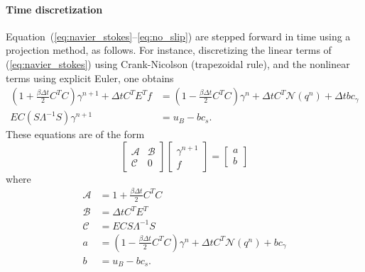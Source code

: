 \documentclass[11pt]{article}
\begin{document}
\paragraph{Time discretization}
Equation~(\ref{eq:navier_stokes}--\ref{eq:no_slip}) are stepped forward in time using a projection method, as follows.  For instance, discretizing the linear terms of (\ref{eq:navier_stokes}) using Crank-Nicolson (trapezoidal rule), and the nonlinear terms using explicit Euler, one obtains
\begin{align}
	\left(1+\frac{\beta\Delta t}{2}C^TC\right)\gamma^{n+1} + \Delta t C^TE^Tf &= \left(1 - \frac{\beta\Delta t}{2}C^TC\right)\gamma^n + \Delta t C^T \mathcal{N}(q^n) + \Delta t bc_\gamma \label{eq:timestepper}\\
	EC(S\Lambda^{-1}S)\gamma^{n+1} &= u_B - bc_s.
\end{align}
These equations are of the form
\begin{equation}
	\begin{bmatrix}
		\mathcal{A} & \mathcal{B}\\\mathcal{C} & 0
	\end{bmatrix}
	\begin{bmatrix}
		\gamma^{n+1}\\ f
	\end{bmatrix}
	=
	\begin{bmatrix}
		a\\b
	\end{bmatrix}
\label{eq:constrained}
\end{equation}
where
\begin{align}
	\mathcal{A} &= 1 + \frac{\beta\Delta t}{2}C^TC\\
	\mathcal{B} &= \Delta t C^TE^T\\
	\mathcal{C} &= ECS\Lambda^{-1}S\\
	a &= \left(1-\frac{\beta\Delta t}{2}C^TC\right)\gamma^n + \Delta t C^T\mathcal{N}(q^n) + bc_\gamma\\
	b &= u_B - bc_s.
\end{align}
\end{document}
